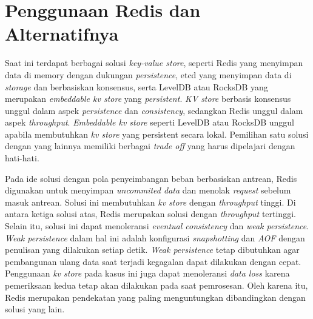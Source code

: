 \section{Penggunaan Redis dan Alternatifnya}

Saat ini terdapat berbagai solusi \textit{key-value store}, seperti Redis yang menyimpan data di memory dengan dukungan \textit{persistence}, etcd yang menyimpan data di \textit{storage} dan berbasiskan konsensus, serta LevelDB atau RocksDB yang merupakan \textit{embeddable kv store} yang \textit{persistent}. \textit{KV store} berbasis konsensus unggul dalam aspek \textit{persistence} dan \textit{consistency}, sedangkan Redis unggul dalam aspek \textit{throughput}. \textit{Embeddable kv store} seperti LevelDB atau RocksDB unggul apabila membutuhkan \textit{kv store} yang persistent secara lokal. Pemilihan satu solusi dengan yang lainnya memiliki berbagai \textit{trade off} yang harus dipelajari dengan hati-hati.

Pada ide solusi dengan pola penyeimbangan beban berbasiskan antrean, Redis digunakan untuk menyimpan \textit{uncommited data} dan menolak \textit{request} sebelum masuk antrean. Solusi ini membutuhkan \textit{kv store} dengan \textit{throughput} tinggi. Di antara ketiga solusi atas, Redis merupakan solusi dengan \textit{throughput} tertinggi. Selain itu, solusi ini dapat menoleransi \textit{eventual consistency} dan \textit{weak persistence}. \textit{Weak persistence} dalam hal ini adalah konfigurasi \textit{snapshotting} dan \textit{AOF} dengan penulisan yang dilakukan setiap detik. \textit{Weak persistence} tetap dibutuhkan agar pembangunan ulang data saat terjadi kegagalan dapat dilakukan dengan cepat. Penggunaan \textit{kv store} pada kasus ini juga dapat menoleransi \textit{data loss} karena pemeriksaan kedua tetap akan dilakukan pada saat pemrosesan. Oleh karena itu, Redis merupakan pendekatan yang paling menguntungkan dibandingkan dengan solusi yang lain.

